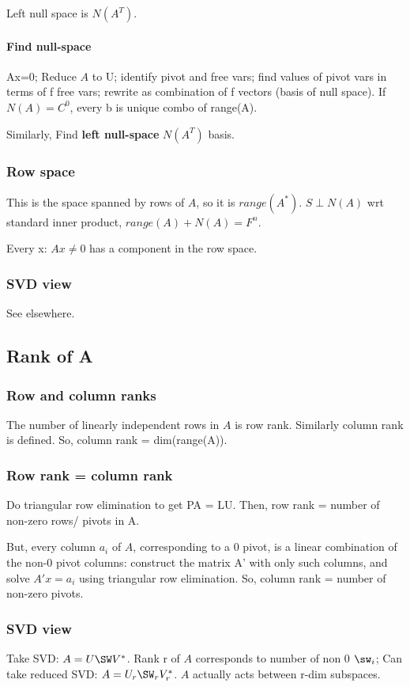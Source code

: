 \documentclass[oneside, article]{memoir}
\begin{document}
Left null space is $N(A^{T})$.

\paragraph{Find null-space}
Ax=0; Reduce $A$ to U; identify pivot and free vars; find values of pivot vars in terms of f free vars; rewrite as combination of f vectors (basis of null space). If $N(A)=C^{0}$, every b is unique combo of range(A).

Similarly, Find \textbf{left null-space} $N(A^{T})$ basis.

\subsubsection{Row space}
This is the space spanned by rows of $A$, so it is $range(A^{*})$. $S \perp N(A)$ wrt standard inner product, $range(A) + N(A) = F^{n}$.

Every x: $Ax \neq 0$ has a component in the row space.

\subsubsection{SVD view}
See elsewhere.

\subsection{Rank of A}
\subsubsection{Row and column ranks}
The number of linearly independent rows in $A$ is row rank. Similarly column rank is defined. So, column rank = dim(range(A)).

\subsubsection{Row rank = column rank}
Do triangular row elimination to get PA = LU. Then, row rank = number of non-zero rows/ pivots in A.

But, every column $a_i$ of $A$, corresponding to a 0 pivot, is a linear combination of the non-0 pivot columns: construct the matrix A' with only such columns, and solve $A'x = a_i$ using triangular row elimination. So, column rank = number of non-zero pivots.

\subsubsection{SVD view}
Take SVD: $A = U \SW V^{*}$. Rank r of $A$ corresponds to number of non 0 $\sw_i$; Can take reduced SVD: $A = U_r \SW_r V_r^{*}$. $A$ actually acts between r-dim subspaces.
\end{document}
